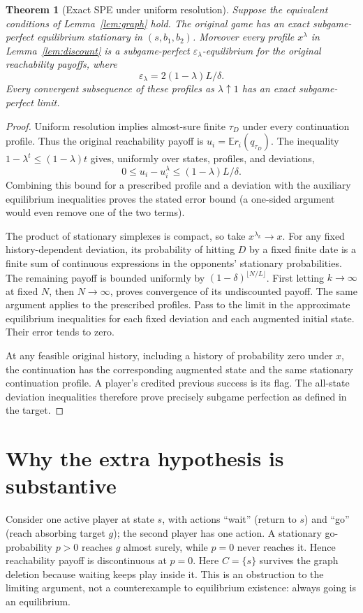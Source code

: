 \documentclass[11pt]{article}
\newtheorem{theorem}{Theorem}
\theoremstyle{remark}\newtheorem{remark}[theorem]{Remark}
\newcommand{\E}{\mathbb E}
\begin{document}
\begin{theorem}[Exact SPE under uniform resolution]\label{thm:main}
Suppose the equivalent conditions of Lemma~\ref{lem:graph} hold. The original game has an exact subgame-perfect equilibrium stationary in $(s,b_1,b_2)$. Moreover every profile $x^\lambda$ in Lemma~\ref{lem:discount} is a subgame-perfect $\varepsilon_\lambda$-equilibrium for the original reachability payoffs, where
\[
 \varepsilon_\lambda=2(1-\lambda)L/\delta.
\]
Every convergent subsequence of these profiles as $\lambda\uparrow1$ has an exact subgame-perfect limit.
\end{theorem}
\begin{proof}
Uniform resolution implies almost-sure finite $\tau_D$ under every continuation profile. Thus the original reachability payoff is $u_i=\E r_i(q_{\tau_D})$. The inequality $1-\lambda^t\leq(1-\lambda)t$ gives, uniformly over states, profiles, and deviations,
\[
 0\leq u_i-u_i^\lambda\leq(1-\lambda)L/\delta.
\]
Combining this bound for a prescribed profile and a deviation with the auxiliary equilibrium inequalities proves the stated error bound (a one-sided argument would even remove one of the two terms).

The product of stationary simplexes is compact, so take $x^{\lambda_k}\to x$. For any fixed history-dependent deviation, its probability of hitting $D$ by a fixed finite date is a finite sum of continuous expressions in the opponents' stationary probabilities. The remaining payoff is bounded uniformly by $(1-\delta)^{\lfloor N/L\rfloor}$. First letting $k\to\infty$ at fixed $N$, then $N\to\infty$, proves convergence of its undiscounted payoff. The same argument applies to the prescribed profiles. Pass to the limit in the approximate equilibrium inequalities for each fixed deviation and each augmented initial state. Their error tends to zero.

At any feasible original history, including a history of probability zero under $x$, the continuation has the corresponding augmented state and the same stationary continuation profile. A player's credited previous success is its flag. The all-state deviation inequalities therefore prove precisely subgame perfection as defined in the target.
\end{proof}

\section*{Why the extra hypothesis is substantive}
Consider one active player at state $s$, with actions ``wait'' (return to $s$) and ``go'' (reach absorbing target $g$); the second player has one action. A stationary go-probability $p>0$ reaches $g$ almost surely, while $p=0$ never reaches it. Hence reachability payoff is discontinuous at $p=0$. Here $C=\{s\}$ survives the graph deletion because waiting keeps play inside it. This is an obstruction to the limiting argument, not a counterexample to equilibrium existence: always going is an equilibrium.
\end{document}
